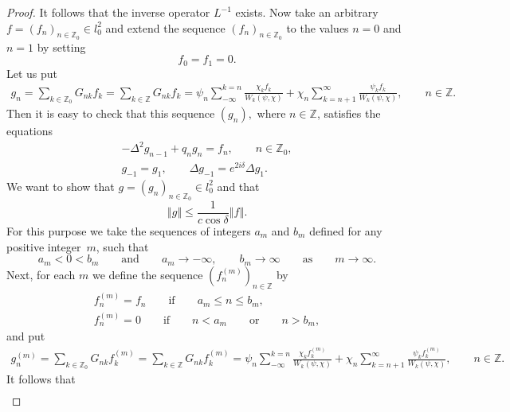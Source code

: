 \begin{proof}
It follows that the inverse operator $L^{-1}$ exists. Now take an arbitrary $%
f=(f_{n})_{n\in
\mathbb{Z}
_{0}}\in l_{0}^{2}$ and extend the sequence $(f_{n})_{n\in
\mathbb{Z}
_{0}}$ to the values $n=0$ and $n=1$ by setting%
\begin{equation*}
f_{0}=f_{1}=0.  %
\end{equation*}%
Let us put%
\begin{gather}
g_{n}=\sum_{k\in
\mathbb{Z}
_{0}}G_{nk}f_{k}=\sum_{k\in
\mathbb{Z}
}G_{nk}f_{k}
=\psi _{n}\sum_{-\infty }^{k=n}\frac{\chi _{k}f_{k}}{W_{k}(\psi ,\chi )}%
+\chi _{n}\sum_{k=n+1}^{\infty }\frac{\psi _{k}f_{k}}{W_{k}(\psi ,\chi )},\qquad
n\in
\mathbb{Z}
.  \label{6.14}
\end{gather}%
Then it is easy to check that this sequence $(g_{n}),$ where $n\in
\mathbb{Z}
$, satisf\/ies the equations%
\begin{gather}
-\Delta ^{2}g_{n-1}+q_{n}g_{n}=f_{n},\qquad n\in
\mathbb{Z}
_{0},  \label{6.15}
\\
g_{-1}=g_{1},\qquad \Delta g_{-1}=e^{2i\delta }\Delta g_{1}.
\label{6.16}
\end{gather}%
We want to show that $g=(g_{n})_{n\in
\mathbb{Z}
_{0}}\in l_{0}^{2}$ and that%
\begin{equation}
\left\Vert g\right\Vert \leq \frac{1}{c\cos \delta }\left\Vert f\right\Vert .
\label{6.17}
\end{equation}%
For this purpose we take the sequences of integers $a_{m}$ and $b_{m}$
def\/ined for any positive integer~$m$, such that%
\[
a_{m}<0<b_{m}\qquad \text{and} \qquad a_{m}\rightarrow -\infty ,\qquad
b_{m}\rightarrow \infty \qquad \text{as} \qquad m\rightarrow \infty .
\]%
Next, for each $m$ we def\/ine the sequence $(f_{n}^{(m)})_{n\in
\mathbb{Z}
}$ by%
\begin{gather}
f_{n}^{(m)}=f_{n}\qquad \text{if} \qquad a_{m}\leq n\leq b_{m},  \label{6.18}
\\
f_{n}^{(m)}=0 \qquad \text{if} \qquad n<a_{m} \qquad \text{or} \qquad n>b_{m},  \label{6.19}
\end{gather}%
and put%
\begin{gather*}
g_{n}^{(m)}=\sum_{k\in
\mathbb{Z}
_{0}}G_{nk}f_{k}^{(m)}=\sum_{k\in
\mathbb{Z}
}G_{nk}f_{k}^{(m)}
=\psi _{n}\sum_{-\infty }^{k=n}\frac{\chi _{k}f_{k}^{(m)}}{W_{k}(\psi ,\chi )%
}+\chi _{n}\sum_{k=n+1}^{\infty }\frac{\psi _{k}f_{k}^{(m)}}{W_{k}(\psi
,\chi )},\qquad n\in \mathbb{Z}
.  %
\end{gather*}%
It follows that%
\begin{gather}

\end{gather}
\end{proof}
